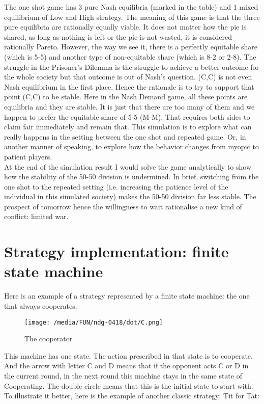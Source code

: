 \documentclass[12.5pt]{report}
\begin{document}
The one shot game has 3 pure Nash equilibria (marked in the table) and 1 mixed equilibrium of Low and High strategy. The meaning of this game is that the three pure equilibria are rationally equally viable. It does not matter how the pie is shared, as long as nothing is left or the pie is not wasted, it is considered rationally Pareto. However, the way we see it, there is a perfectly equitable share (which is 5-5) and another type of non-equitable share (which is 8-2 or 2-8). The struggle in the Prisoner's Dilemma is the struggle to achieve a better outcome for the whole society but that outcome is out of Nash's question. (C,C) is not even Nash equilibrium in the first place. Hence the rationale is to try to support that point (C,C) to be stable. Here in the Nash Demand game, all these points are equilibria and they are stable. It is just that there are too many of them and we happen to prefer the equitable share of 5-5 (M-M). That requires both sides to claim fair immediately and remain that. This simulation is to explore what can really happens in the setting between the one shot and repeated game. Or, in another manner of speaking, to explore how the behavior changes from myopic to patient players.\\

At the end of the simulation result I would solve the game analytically to show how the stability of the 50-50 division is undermined. In brief, switching from the one shot to the repeated setting (i.e. increasing the patience level of the individual in this simulated society) makes the 50-50 division far less stable. The prospect of tomorrow hence the willingness to wait rationalise a new kind of conflict: limited war.\\

\section{Strategy implementation: finite state machine}

Here is an example of a strategy represented by a finite state machine: the one that always cooperates.

\begin{figure}[h!]
\center
\texttt{[image: /media/FUN/ndg-0418/dot/C.png]}
\caption{The cooperator}
\end{figure}

This machine has one state. The action prescribed in that state is to cooperate. And the arrow with letter C and D means that if the opponent acts C or D in the current round, in the next round this machine stays in the same state of Cooperating. The double circle means that this is the initial state to start with. To illustrate it better, here is the example of another classic strategy: Tit for Tat:
\end{document}
